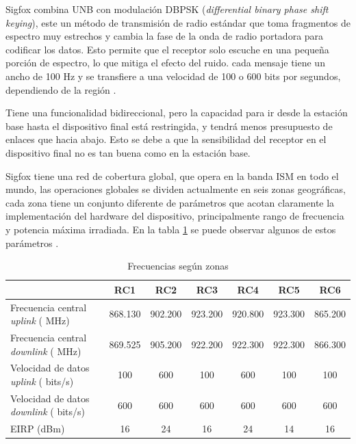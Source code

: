 Sigfox combina UNB con modulación  DBPSK (\textit{differential binary phase shift keying}), este un método de transmisión de radio estándar que toma fragmentos de espectro muy estrechos y cambia la fase de la onda de radio portadora para codificar los datos. Esto permite que el receptor solo escuche en una pequeña porción de espectro, lo que mitiga el efecto del ruido. cada mensaje tiene un ancho de 100 Hz y se transfiere a una velocidad de 100 o 600 bits por segundos, dependiendo de la región \cite{RSpec}. %

Tiene una funcionalidad bidireccional, pero la capacidad para ir desde la estación base hasta el dispositivo final está restringida, y tendrá menos presupuesto de enlaces que hacia abajo. Esto se debe a que la sensibilidad del receptor en el dispositivo final no es tan buena como en la estación base.

Sigfox tiene una red de cobertura global, que opera en la banda ISM en todo el mundo, las operaciones globales se dividen actualmente en seis  zonas geográficas, cada zona tiene un conjunto diferente de parámetros que acotan claramente la implementación del hardware del dispositivo, principalmente rango de frecuencia y potencia máxima irradiada. En la tabla \ref{tab:ZonasSigfox} se puede observar algunos de estos parámetros \cite{RConfg}.

\begin{table}[h]
	\centering
	\caption[Zonas de frecuencia]{Frecuencias según zonas}
	\begin{tabular}{l c c c c c c}    
		\toprule
		\textbf{ } 	   & \textbf{RC1} & \textbf{RC2} 	& \textbf{RC3}  & \textbf{RC4}   & \textbf{RC5}	& \textbf{RC6} \\
		\midrule
		Frecuencia central \textit{uplink} ( MHz)	    & 868.130 	& 902.200	&923.200  &920.800	&923.300 &865.200\\	
		Frecuencia central \textit{downlink} ( MHz) 	& 869.525	& 905.200   &922.200 &922.300	&922.300	&866.300\\
		Velocidad de datos \textit{uplink} ( bits/s)	& 100       &600        &100     &600       &100        &100\\	
		Velocidad de datos \textit{downlink} ( bits/s)	& 600       & 600    	&600     & 600       & 600    	&600\\
		EIRP (dBm)		                             	 & 16       & 24		&16     &24	        &14         &16\\
		\bottomrule
		\hline
	\end{tabular}
	\label{tab:ZonasSigfox}
\end{table}

